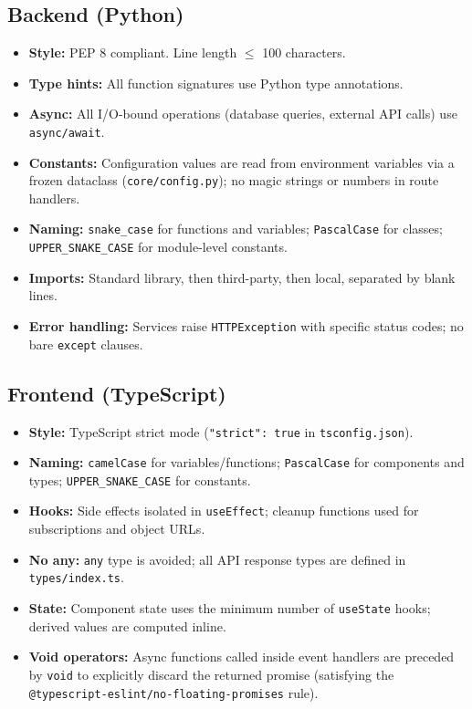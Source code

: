 \subsection{Backend (Python)}
\begin{itemize}
    \item \textbf{Style:} PEP 8 compliant. Line length $\leq$ 100 characters.
    \item \textbf{Type hints:} All function signatures use Python type annotations.
    \item \textbf{Async:} All I/O-bound operations (database queries, external API calls) use \texttt{async/await}.
    \item \textbf{Constants:} Configuration values are read from environment variables via a frozen dataclass (\texttt{core/config.py}); no magic strings or numbers in route handlers.
    \item \textbf{Naming:} \texttt{snake\_case} for functions and variables; \texttt{PascalCase} for classes; \texttt{UPPER\_SNAKE\_CASE} for module-level constants.
    \item \textbf{Imports:} Standard library, then third-party, then local, separated by blank lines.
    \item \textbf{Error handling:} Services raise \texttt{HTTPException} with specific status codes; no bare \texttt{except} clauses.
\end{itemize}

\subsection{Frontend (TypeScript)}
\begin{itemize}
    \item \textbf{Style:} TypeScript strict mode (\texttt{"strict": true} in \texttt{tsconfig.json}).
    \item \textbf{Naming:} \texttt{camelCase} for variables/functions; \texttt{PascalCase} for components and types; \texttt{UPPER\_SNAKE\_CASE} for constants.
    \item \textbf{Hooks:} Side effects isolated in \texttt{useEffect}; cleanup functions used for subscriptions and object URLs.
    \item \textbf{No any:} \texttt{any} type is avoided; all API response types are defined in \texttt{types/index.ts}.
    \item \textbf{State:} Component state uses the minimum number of \texttt{useState} hooks; derived values are computed inline.
    \item \textbf{Void operators:} Async functions called inside event handlers are preceded by \texttt{void} to explicitly discard the returned promise (satisfying the \texttt{@typescript-eslint/no-floating-promises} rule).
\end{itemize}

